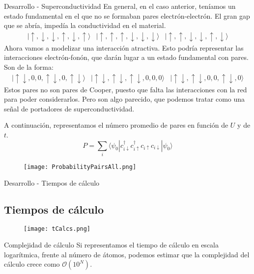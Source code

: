 \documentclass{beamer}
\begin{document}
\begin{frame}{Desarrollo - Superconductividad}
    En general, en el caso anterior, teníamos un estado fundamental en el que no se formaban pares electrón-electrón. El gran gap que se abría, impedía la conductividad en el material.
    $$
    \begin{array}{ccc}
        |\uparrow, \downarrow, \downarrow, \uparrow, \downarrow, \uparrow\rangle & |\uparrow, \uparrow, \uparrow, \downarrow, \downarrow, \downarrow\rangle & |\uparrow, \uparrow, \downarrow, \downarrow, \uparrow, \downarrow\rangle
    \end{array}
    $$
    Ahora vamos a modelizar una interacción atractiva. Esto podría representar las interacciones electrón-fonón, que darán lugar a un estado fundamental con pares. Son de la forma:
    $$
    \begin{array}{ccc}
        |\uparrow\downarrow, 0, 0, \uparrow\downarrow, 0, \uparrow\downarrow\rangle & |\uparrow\downarrow, \uparrow\downarrow, \uparrow\downarrow, 0, 0, 0\rangle & |\uparrow\downarrow, \uparrow\downarrow, 0, 0, \uparrow\downarrow, 0\rangle
    \end{array}
    $$
    Estos pares no son pares de Cooper, puesto que falta las interacciones con la red para poder considerarlos. Pero son algo parecido, que podemos tratar como una señal de portadores de superconductividad.
\end{frame}
\begin{frame}
    A continuación, representamos el número promedio de pares en función de $U$ y de $t$.
    \begin{equation}
        P = \sum_i\langle\psi_0|c_{i\downarrow}^{\dagger}c_{i\uparrow}^{\dagger}c_{i\uparrow}c_{i\downarrow}|\psi_0\rangle
    \end{equation}
    \begin{figure}
        \texttt{[image: ProbabilityPairsAll.png]}
    \end{figure}
\end{frame}
\begin{frame}{Desarrollo - Tiempos de cálculo}
    \subsection{Tiempos de cálculo}
    \begin{figure}
        \texttt{[image: tCalcs.png]}
    \end{figure}
    \begin{block}{Complejidad de cálculo}
        Si representamos el tiempo de cálculo en escala logarítmica, frente al número de átomos, podemos estimar que la complejidad del cálculo crece como $\mathcal{O}(10^N)$.
    \end{block}
\end{frame}
\end{document}
